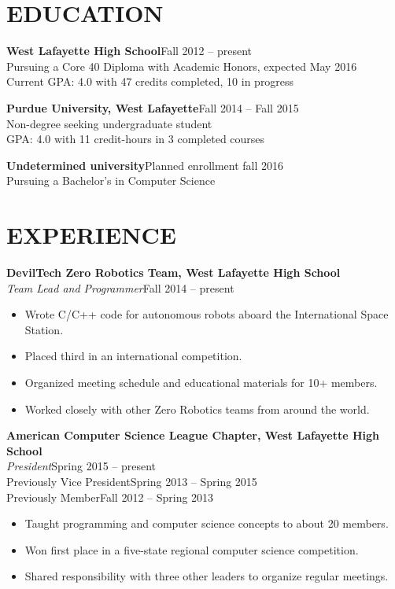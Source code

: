 \documentclass[line,margin]{res}
\begin{document}
\begin{resume}

  \section{EDUCATION}
  {\bf\rmfamily West Lafayette High School}\hfill Fall 2012 -- present\\
  Pursuing a Core 40 Diploma with Academic Honors, expected May 2016\\
  Current GPA: 4.0 with 47 credits completed, 10 in progress

  {\bf\rmfamily Purdue University, West Lafayette}\hfill Fall 2014 -- Fall 2015\\
  Non-degree seeking undergraduate student\\
  GPA: 4.0 with 11 credit-hours in 3 completed courses

  {\bf\rmfamily Undetermined university}\hfill Planned enrollment fall 2016\\
  Pursuing a Bachelor's in Computer Science\\



  \section{EXPERIENCE}
  {\bf\rmfamily DevilTech Zero Robotics Team, West Lafayette High School}\\
  \emph{Team Lead and Programmer}\hfill Fall 2014 -- present
  \begin{itemize}  \itemsep -2pt %
  \item Wrote C/C++ code for autonomous robots aboard the International Space Station.
  \item Placed third in an international competition.
  \item Organized meeting schedule and educational materials for 10+ members.
  \item Worked closely with other Zero Robotics teams from around the world.
  \end{itemize}

  {\bf\rmfamily American Computer Science League Chapter, West Lafayette High School}\\
  \emph{President}\hfill Spring 2015 -- present\\
  Previously Vice President\hfill Spring 2013 -- Spring 2015\\
  Previously Member\hfill Fall 2012 -- Spring 2013
  \begin{itemize}  \itemsep -2pt %
  \item Taught programming and computer science concepts to about 20 members.
  \item Won first place in a five-state regional computer science competition.
  \item Shared responsibility with three other leaders to organize regular meetings.
  \end{itemize}


\end{resume}
\end{document}
